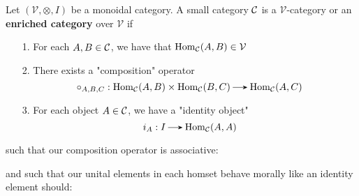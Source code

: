 \begin{definition}
    Let $(\mathcal{V}, \otimes, I)$ be a monoidal category. A small category $\mathcal{C}$ is a $\mathcal{V}$-category 
    or an \textbf{enriched category} over $\mathcal{V}$ if 
    \begin{itemize}
        \item[1.] For each $A, B \in \mathcal{C}$, we have that $\operatorname{\mathrm{Hom}}_{\mathcal{C}}(A, B) \in \mathcal{V}$ 
        \item[2.] There exists a "composition" operator 
        \[
            \circ_{A, B, C} : \hom_{\cc}(A, B) \times \hom_{\cc}(B, C) \to \hom_{\cc}(A, C)
        \]  
        \item[3.] For each object $A \in \mathcal{C}$, we have a "identity object" 
        \[
            i_A: I \to \hom_{\cc}(A, A)  
        \] 
    \end{itemize}
    such that our composition operator is associative: 
    \begin{center}
    \end{center}
    and such that our unital elements in each homset behave morally like an identity 
    element should:
    \begin{center}
    \end{center}
\end{definition}

